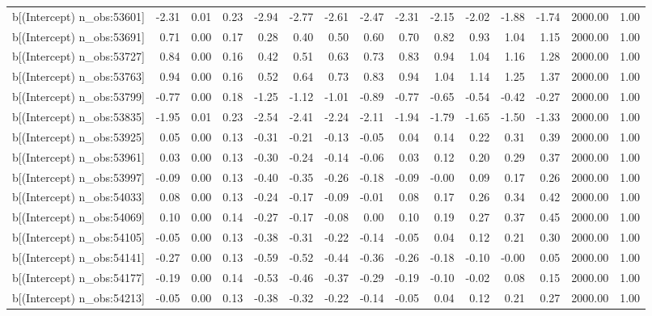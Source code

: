 \begin{table}[ht]
\begin{tabular}{rrrrrrrrrrrrrrr}
  b[(Intercept) n\_obs:53601] & -2.31 & 0.01 & 0.23 & -2.94 & -2.77 & -2.61 & -2.47 & -2.31 & -2.15 & -2.02 & -1.88 & -1.74 & 2000.00 & 1.00 \\ 
  b[(Intercept) n\_obs:53691] & 0.71 & 0.00 & 0.17 & 0.28 & 0.40 & 0.50 & 0.60 & 0.70 & 0.82 & 0.93 & 1.04 & 1.15 & 2000.00 & 1.00 \\ 
  b[(Intercept) n\_obs:53727] & 0.84 & 0.00 & 0.16 & 0.42 & 0.51 & 0.63 & 0.73 & 0.83 & 0.94 & 1.04 & 1.16 & 1.28 & 2000.00 & 1.00 \\ 
  b[(Intercept) n\_obs:53763] & 0.94 & 0.00 & 0.16 & 0.52 & 0.64 & 0.73 & 0.83 & 0.94 & 1.04 & 1.14 & 1.25 & 1.37 & 2000.00 & 1.00 \\ 
  b[(Intercept) n\_obs:53799] & -0.77 & 0.00 & 0.18 & -1.25 & -1.12 & -1.01 & -0.89 & -0.77 & -0.65 & -0.54 & -0.42 & -0.27 & 2000.00 & 1.00 \\ 
  b[(Intercept) n\_obs:53835] & -1.95 & 0.01 & 0.23 & -2.54 & -2.41 & -2.24 & -2.11 & -1.94 & -1.79 & -1.65 & -1.50 & -1.33 & 2000.00 & 1.00 \\ 
  b[(Intercept) n\_obs:53925] & 0.05 & 0.00 & 0.13 & -0.31 & -0.21 & -0.13 & -0.05 & 0.04 & 0.14 & 0.22 & 0.31 & 0.39 & 2000.00 & 1.00 \\ 
  b[(Intercept) n\_obs:53961] & 0.03 & 0.00 & 0.13 & -0.30 & -0.24 & -0.14 & -0.06 & 0.03 & 0.12 & 0.20 & 0.29 & 0.37 & 2000.00 & 1.00 \\ 
  b[(Intercept) n\_obs:53997] & -0.09 & 0.00 & 0.13 & -0.40 & -0.35 & -0.26 & -0.18 & -0.09 & -0.00 & 0.09 & 0.17 & 0.26 & 2000.00 & 1.00 \\ 
  b[(Intercept) n\_obs:54033] & 0.08 & 0.00 & 0.13 & -0.24 & -0.17 & -0.09 & -0.01 & 0.08 & 0.17 & 0.26 & 0.34 & 0.42 & 2000.00 & 1.00 \\ 
  b[(Intercept) n\_obs:54069] & 0.10 & 0.00 & 0.14 & -0.27 & -0.17 & -0.08 & 0.00 & 0.10 & 0.19 & 0.27 & 0.37 & 0.45 & 2000.00 & 1.00 \\ 
  b[(Intercept) n\_obs:54105] & -0.05 & 0.00 & 0.13 & -0.38 & -0.31 & -0.22 & -0.14 & -0.05 & 0.04 & 0.12 & 0.21 & 0.30 & 2000.00 & 1.00 \\ 
  b[(Intercept) n\_obs:54141] & -0.27 & 0.00 & 0.13 & -0.59 & -0.52 & -0.44 & -0.36 & -0.26 & -0.18 & -0.10 & -0.00 & 0.05 & 2000.00 & 1.00 \\ 
  b[(Intercept) n\_obs:54177] & -0.19 & 0.00 & 0.14 & -0.53 & -0.46 & -0.37 & -0.29 & -0.19 & -0.10 & -0.02 & 0.08 & 0.15 & 2000.00 & 1.00 \\ 
  b[(Intercept) n\_obs:54213] & -0.05 & 0.00 & 0.13 & -0.38 & -0.32 & -0.22 & -0.14 & -0.05 & 0.04 & 0.12 & 0.21 & 0.27 & 2000.00 & 1.00 \\ 

\end{tabular}
\end{table}
